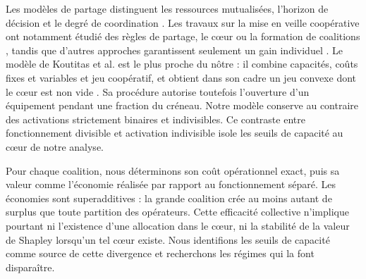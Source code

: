 Les modèles de partage distinguent les ressources mutualisées, l'horizon de
décision et le degré de coordination \cite{cano2020}. Les travaux sur la mise
en veille coopérative ont notamment étudié des règles de partage, le cœur ou
la formation de coalitions \cite{militano2013,hasan2013,anglano2014}, tandis
que d'autres approches garantissent seulement un gain individuel
\cite{tan2023}. Le modèle de Koutitas et al. est le plus proche du nôtre : il
combine capacités, coûts fixes et variables et jeu coopératif, et obtient dans
son cadre un jeu convexe dont le cœur est non vide \cite{koutitas2016}. Sa
procédure autorise toutefois l'ouverture d'un équipement pendant une fraction
du créneau. Notre modèle conserve au contraire des activations strictement
binaires et indivisibles. Ce contraste entre fonctionnement divisible et
activation indivisible isole les seuils de capacité au cœur de notre analyse.

Pour chaque coalition, nous déterminons son coût opérationnel exact, puis sa
valeur comme l'économie réalisée par rapport au fonctionnement séparé. Les
économies sont superadditives : la grande coalition crée au moins autant de
surplus que toute partition des opérateurs. Cette efficacité collective
n'implique pourtant ni l'existence d'une allocation dans le cœur, ni la
stabilité de la valeur de Shapley lorsqu'un tel cœur existe. Nous identifions
les seuils de capacité comme source de cette divergence et recherchons les
régimes qui la font disparaître.

